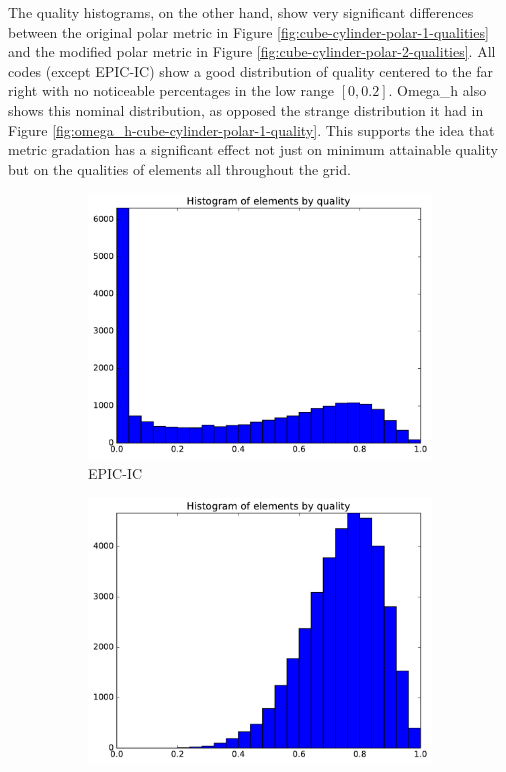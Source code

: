 \documentclass[3p,times,procedia,number]{elsarticle}
\begin{document}
The quality histograms, on the other hand, show very significant differences
between the original polar metric in Figure \ref{fig:cube-cylinder-polar-1-qualities}
and the modified polar metric in Figure \ref{fig:cube-cylinder-polar-2-qualities}.
All codes (except EPIC-IC) show a good distribution of quality centered to the
far right with no noticeable percentages in the low range $[0,0.2]$.
Omega\_h also shows this nominal distribution, as opposed the strange distribution
it had in Figure \ref{fig:omega_h-cube-cylinder-polar-1-quality}.
This supports the idea that metric gradation has a significant effect not just
on minimum attainable quality but on the qualities of elements all throughout the grid.

\begin{figure}
\begin{subfigure}{.24\textwidth}
\centering
\includegraphics[width=\textwidth]{epic-ic-cube-cylinder-polar-2-quality.pdf}
\caption{EPIC-IC}
\end{subfigure}
\begin{subfigure}{.24\textwidth}
\centering
\includegraphics[width=\textwidth]{epic-ics-cube-cylinder-polar-2-quality.pdf}

\end{subfigure}
\end{figure}
\end{document}
